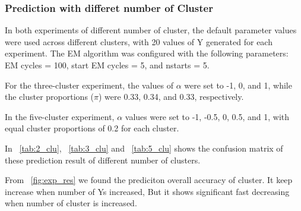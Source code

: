\documentclass{article}
\begin{document}
\subsubsection*{Prediction with differet number of Cluster}

In both experiments of different number of cluster, 
the default parameter values were used across different clusters, 
with 20 values of Y generated for each experiment. 
The EM algorithm was configured with the following parameters: EM cycles = 100, start EM cycles = 5, and nstarts = 5.

For the three-cluster experiment, the values of $\alpha$ were set to -1, 0, and 1, 
while the cluster proportions ($\pi$) were 0.33, 0.34, and 0.33, respectively. 

In the five-cluster experiment, $\alpha$ values were set to -1, -0.5, 0, 0.5, and 1, 
with equal cluster proportions of 0.2 for each cluster.

In ~\ref*{tab:2_clu}, ~\ref*{tab:3_clu} and ~\ref*{tab:5_clu} shows the confusion matrix of these prediction result of different number of clusters.

From ~\ref*{fig:exp_res} we found the prediciton overall accuracy of cluster.
It keep increase when number of Ys increased,
But it shows significant fast decreasing when number of cluster is increased.
\end{document}
